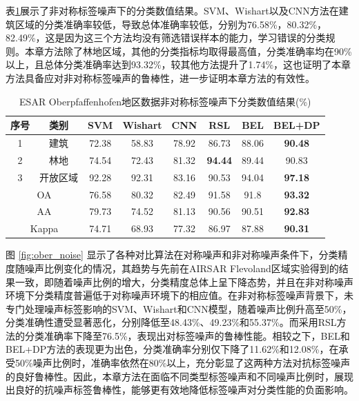 表\ref{tab:ober_res_random}展示了非对称标签噪声下的分类数值结果。SVM、Wishart以及CNN方法在建筑区域的分类准确率较低，导致总体准确率较低，分别为76.58\%，80.32\%，82.49\%，这是因为这三个方法均没有筛选错误样本的能力，学习错误的分类规则。本章方法除了林地区域，其他的分类指标均取得最高值，分类准确率均在90\%以上，且总体分类准确率达到93.32\%，较其他方法提升了1.74\%，这也证明了本章方法具备应对非对称标签噪声的鲁棒性，进一步证明本章方法的有效性。
\begin{table}[ht!]
    \caption{ESAR Oberpfaffenhofen地区数据非对称标签噪声下分类数值结果(\%)}
    \label{tab:ober_res_random}
    \begin{tabular}{cccccccc}
        \toprule[1.5bp]
        序号                        & 类别    & SVM   & Wishart & CNN   & RSL            & BEL            & BEL+DP         \\
        \midrule[0.75bp]
        1                         & 建筑    & 72.38 & 58.83   & 78.92 & 86.73          & 88.06          & \textbf{90.48} \\
        2                         & 林地    & 74.54 & 72.43   & 81.32 & \textbf{94.44} & 89.44          & 90.83          \\
        3                         & 开放区域  & 92.28 & 92.31   & 83.16 & 90.53          & 94.04          & \textbf{97.18} \\
        \midrule[0.75bp]
        \multicolumn{2}{c}{OA}    & 76.58 & 80.32 & 82.49   & 91.58 & 91.8           & \textbf{93.32}                  \\
        \multicolumn{2}{c}{AA}    & 79.73 & 74.52 & 81.13   & 90.56 & 90.51          & \textbf{92.83}                  \\
        \multicolumn{2}{c}{Kappa} & 74.71 & 68.93 & 77.32   & 86.97 & 87.88          & \textbf{90.31}                  \\
        \bottomrule[0.75bp]
    \end{tabular}
\end{table}

图 \ref{fig:ober_noise} 显示了各种对比算法在对称噪声和非对称噪声条件下，分类精度随噪声比例变化的情况，其趋势与先前在AIRSAR Flevoland区域实验得到的结果一致，即随着噪声比例的增大，分类精度总体上呈下降态势，并且在非对称噪声环境下分类精度普遍低于对称噪声环境下的相应值。在非对称标签噪声背景下，未专门处理噪声标签影响的SVM、Wishart和CNN模型，随着噪声比例升高至50\%，分类准确性遭受显著恶化，分别降低至48.43\%、49.23\%和55.37\%。而采用RSL方法的分类准确率下降至76.5\%，表现出对标签噪声的鲁棒性能。相较之下，BEL和BEL+DP方法的表现更为出色，分类准确率分别仅下降了11.62\%和12.08\%，在承受50\%噪声比例时，准确率依然在80\%以上，充分彰显了这两种方法对抗标签噪声的良好鲁棒性。因此，本章方法在面临不同类型标签噪声和不同噪声比例时，展现出良好的抗噪声标签鲁棒性，能够更有效地降低标签噪声对分类性能的负面影响。

